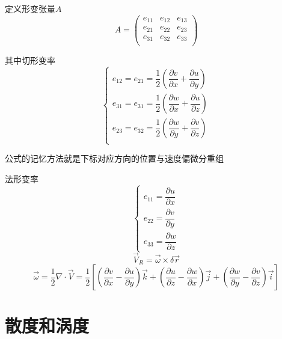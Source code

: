\documentclass[a4paper,oneside]{ctexbook}
\begin{document}
定义形变张量\(A\)
\begin{equation}
A=\begin{pmatrix}
    e_{11}&e_{12}&e_{13}\\
    e_{21}&e_{22}&e_{23}\\
    e_{31}&e_{32}&e_{33}\\
\end{pmatrix}
\end{equation}

其中切形变率
\begin{equation}
    \begin{cases}
    e_{12}=e_{21}=\dfrac{1}{2}(\dfrac{\partial{v}}{\partial{x}}+\dfrac{\partial{u}}{\partial{y}})\\
    e_{31}=e_{31}=\dfrac{1}{2}(\dfrac{\partial{w}}{\partial{x}}+\dfrac{\partial{u}}{\partial{z}})\\
    e_{23}=e_{32}=\dfrac{1}{2}(\dfrac{\partial{w}}{\partial{y}}+\dfrac{\partial{v}}{\partial{z}})\\
    \end{cases}
\end{equation}

公式的记忆方法就是下标对应方向的位置与速度偏微分重组

法形变率
\begin{equation}
    \begin{cases}
    e_{11}=\dfrac{\partial{u}}{\partial{x}}\\
    e_{22}=\dfrac{\partial{v}}{\partial{y}}\\
    e_{33}=\dfrac{\partial{w}}{\partial{z}}
    \end{cases}
\end{equation}
\begin{equation}
\overrightarrow{V}_R=\overrightarrow{\omega}\times\delta\overrightarrow{r}
\end{equation}
\begin{equation}
\overrightarrow{\omega}=\dfrac{1}{2}\nabla\cdot\overrightarrow{V}=\dfrac{1}{2}\left[\left(\dfrac{\partial{v}}{\partial{x}}-\dfrac{\partial{u}}{\partial{y}}\right)\overrightarrow{k}+\left(\dfrac{\partial{u}}{\partial{z}}-\dfrac{\partial{w}}{\partial{x}}\right)\overrightarrow{j}+\left(\dfrac{\partial{w}}{\partial{y}}-\dfrac{\partial{v}}{\partial{z}}\right)\overrightarrow{i}\right]
\end{equation}

\section{散度和涡度}
\end{document}
